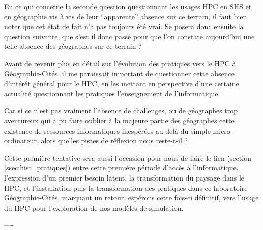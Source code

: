 En ce qui concerne la seconde question questionnant les usages HPC en SHS et en géographie vis à vis de leur \enquote{apparente} absence sur ce terrain, il faut bien noter que cet état de fait n'a pas toujours été vrai. Se posera donc ensuite la question suivante, que s'est il donc passé pour que l'on constate aujourd'hui une telle absence des géographes sur ce terrain ?

Avant de revenir plus en détail sur l'évolution des pratiques vers le HPC à Géographie-Cités, il me paraissait important de questionner cette absence d'intérét général pour le HPC, en les mettant en perspective d'une certaine actualité questionnant les pratiques l'enseignement de l'informatique.

Car si ce n'est pas vraiment l'absence de challenges, ou de géographes trop aventureux qui a pu faire oublier à la majeure partie des géographes cette existence de ressources informatiques inespérées au-delà du simple micro-ordinateur, alors quelles pistes de réflexion nous reste-t-il  ?

Cette première tentative sera aussi l'occasion pour nous de faire le lien (section \ref{ssec:hist_pratiques}) entre cette première période d'accès à l'informatique, l'expression d'un premier besoin latent, la transformation du paysage dans le HPC, et l'installation puis la transformation des pratiques dans ce laboratoire Géographie-Cités, marquant un retour, espérons cette fois-ci définitif, vers l'usage du HPC pour l'exploration de nos modèles de simulation.

----


